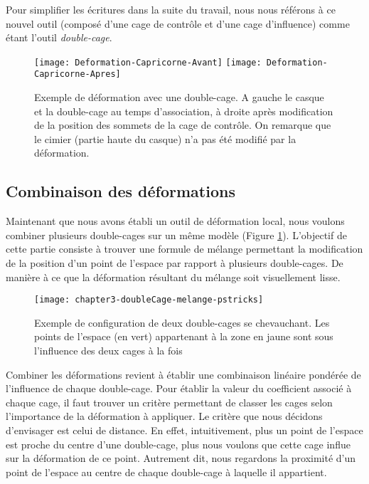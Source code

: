 Pour simplifier les écritures dans la suite du travail, nous nous référons à
ce nouvel outil (composé d'une cage de contrôle et d'une cage d'influence)
comme étant l'outil \textit{double-cage}.

\begin{figure}[ht]
  \begin{center}
    \texttt{[image: Deformation-Capricorne-Avant]}
    \texttt{[image: Deformation-Capricorne-Apres]}

    \caption[Exemple de déformation double-cage] {Exemple de
déformation avec une double-cage. A gauche le casque et la
double-cage au temps d'association, à droite après modification de la position
des sommets de la cage de contrôle. On remarque que le cimier (partie
haute du casque) n'a pas été modifié par la déformation.}

  \end{center}
\end{figure}

\subsection{Combinaison des déformations}

Maintenant que nous avons établi un outil de déformation local, nous voulons
combiner plusieurs double-cages sur un même modèle (Figure \ref{MELMC}).
L'objectif de cette partie consiste à trouver une formule de mélange
permettant la modification de la position d'un point de l'espace par rapport à
plusieurs double-cages. De manière à ce que la déformation résultant du
mélange soit visuellement lisse.

\begin{figure}[ht]
  \begin{center}
    \texttt{[image: chapter3-doubleCage-melange-pstricks]}

    \caption[Mélange de double-cages] {Exemple de
configuration de deux double-cages se chevauchant. Les points
de l'espace (en vert) appartenant à la zone en jaune sont sous l'influence des
deux cages à la fois}

    \label{MELMC}
  \end{center}
\end{figure}

Combiner les déformations revient à établir une combinaison linéaire pondérée
de l'influence de chaque double-cage. Pour établir la valeur du coefficient
associé à chaque cage, il faut trouver un critère permettant de classer les
cages selon l'importance de la déformation à appliquer. Le critère que nous
décidons d'envisager est celui de distance. En effet, intuitivement, plus un
point de l'espace est proche du centre d'une double-cage, plus nous voulons
que cette cage influe sur la déformation de ce point. Autrement dit, nous
regardons la proximité d'un point de l'espace au centre de chaque double-cage
à laquelle il appartient.

